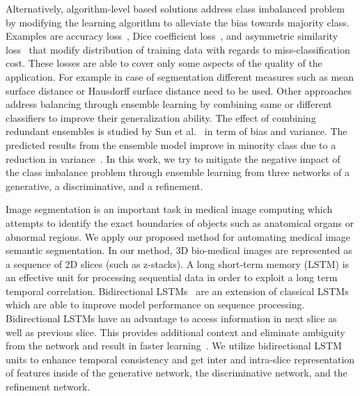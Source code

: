 \documentclass[10pt,twocolumn,letterpaper]{article}
\begin{document}
Alternatively, algorithm-level based solutions address class imbalanced problem by modifying the learning algorithm to alleviate the bias towards majority class. Examples are accuracy loss~\cite{sudre2017generalised}, Dice coefficient loss~\cite{isensee2017brain,isensee2017automatic}, and asymmetric similarity loss~\cite{D11078} that modify distribution of training data with regards to miss-classification cost. These losses are able to cover only some aspects of the quality of the application. For example in case of segmentation different measures such as mean surface distance or Hausdorff surface distance need to be used.
Other approaches address balancing through ensemble learning by combining same or different classifiers to improve their generalization ability. The effect of combining redundant ensembles is studied by Sun et al.~\cite{sun2007cost} in term of bias and variance. The predicted results from the ensemble model improve in minority class due to a reduction in variance~\cite{sun2007cost}. In this work, we try to mitigate the negative impact of the class imbalance problem through ensemble learning from three networks of a generative, a discriminative, and a refinement.


Image segmentation is an important task in medical image computing which attempts to identify the exact boundaries of objects such as anatomical organs or abnormal regions. We apply our proposed method for automating medical image semantic segmentation. In our method, 3D bio-medical images are represented as a sequence of 2D slices (such as z-stacks). A long short-term memory (LSTM) is an effective unit for processing sequential data in order to exploit a long term temporal correlation. Bidirectional LSTMs~\cite{graves2005framewise} are an extension of classical LSTMs which are able to improve model performance on sequence processing. Bidirectional LSTMs have an advantage to access information in next slice as well as previous slice. This provides additional context and eliminate ambiguity from the network and result in faster learning~\cite{graves2005framewise}.
We utilize bidirectional LSTM units to enhance temporal consistency and get inter and intra-slice representation of features inside of the generative network, the discriminative network, and the refinement network.
\end{document}
